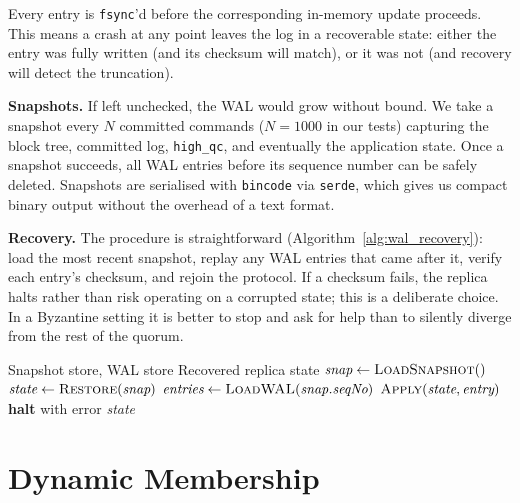 Every entry is \texttt{fsync}'d before the corresponding in-memory update proceeds.  This
means a crash at any point leaves the log in a recoverable state: either the entry was fully
written (and its checksum will match), or it was not (and recovery will detect the
truncation).

\smallskip\noindent\textbf{Snapshots.}\quad
If left unchecked, the WAL would grow without bound.  We take a snapshot every $N$ committed
commands ($N{=}1000$ in our tests) capturing the block tree, committed log,
\texttt{high\_qc}, and eventually the application state.  Once a snapshot succeeds, all WAL
entries before its sequence number can be safely deleted.  Snapshots are serialised with
\texttt{bincode} via \texttt{serde}, which gives us compact binary output without the
overhead of a text format.

\smallskip\noindent\textbf{Recovery.}\quad
The procedure is straightforward (Algorithm~\ref{alg:wal_recovery}): load the most recent
snapshot, replay any WAL entries that came after it, verify each entry's checksum, and
rejoin the protocol.  If a checksum fails, the replica halts rather than risk operating on a
corrupted state; this is a deliberate choice.  In a Byzantine setting it is better to stop
and ask for help than to silently diverge from the rest of the quorum.

\begin{algorithm}[t]
\caption{Recovery from snapshot + WAL}
\label{alg:wal_recovery}
\begin{algorithmic}[1]
\REQUIRE Snapshot store, WAL store
\ENSURE Recovered replica state
    \STATE $\textit{snap} \gets \textsc{LoadSnapshot}()$
    \STATE $\textit{state} \gets \textsc{Restore}(\textit{snap})$
    \STATE $\textit{entries} \gets \textsc{LoadWAL}(\textit{snap.seqNo})$
            \STATE $\textsc{Apply}(\textit{state}, \textit{entry})$
        \ELSE
            \STATE \textbf{halt} with error
        \ENDIF
    \ENDFOR
    \RETURN \textit{state}
\end{algorithmic}
\end{algorithm}

\section{Dynamic Membership}
\label{sec:membership}

